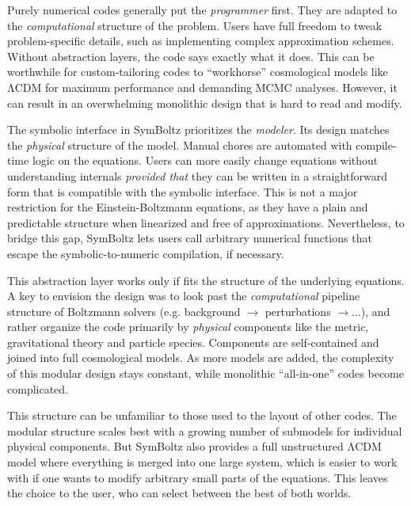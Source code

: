 \documentclass{aa}
\newcommand{\LCDM}{$\mathrm{\Lambda C D M}$}
\begin{document}
Purely numerical codes generally put the \emph{programmer} first.
They are adapted to the \emph{computational} structure of the problem.
Users have full freedom to tweak problem-specific details, such as implementing complex approximation schemes.
Without abstraction layers, the code says exactly what it does.
This can be worthwhile for custom-tailoring codes to \enquote{workhorse} cosmological models like \LCDM{} for maximum performance and demanding MCMC analyses.
However, it can result in an overwhelming monolithic design that is hard to read and modify.

The symbolic interface in SymBoltz prioritizes the \emph{modeler}.
Its design matches the \emph{physical} structure of the model.
Manual chores are automated with compile-time logic on the equations.
Users can more easily change equations without understanding internals \emph{provided that} they can be written in a straightforward form that is compatible with the symbolic interface.
This is not a major restriction for the Einstein-Boltzmann equations, as they have a plain and predictable structure when linearized and free of approximations.
Nevertheless, to bridge this gap, SymBoltz lets users call arbitrary numerical functions that escape the symbolic-to-numeric compilation, if necessary.

This abstraction layer works only if fits the structure of the underlying equations.
A key to envision the design was to look past the \emph{computational} pipeline structure of Boltzmann solvers (e.g. background $\rightarrow$ perturbations $\rightarrow \ldots$), and rather organize the code primarily by \emph{physical} components like the metric, gravitational theory and particle species.
Components are self-contained and joined into full cosmological models.
As more models are added, the complexity of this modular design stays constant, while monolithic \enquote{all-in-one} codes become complicated.

This structure can be unfamiliar to those used to the layout of other codes.
The modular structure scales best with a growing number of submodels for individual physical components.
But SymBoltz also provides a full unstructured \LCDM{} model where everything is merged into one large system, which is easier to work with if one wants to modify arbitrary small parts of the equations.
This leaves the choice to the user, who can select between the best of both worlds.
\end{document}

